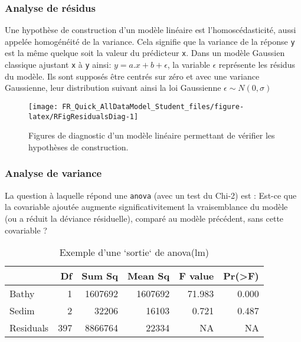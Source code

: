 \documentclass[french,a4paper]{article}
\begin{document}
\subsubsection{Analyse de résidus}\label{analyse-de-residus}

Une hypothèse de construction d'un modèle linéaire est
l'homoscédasticité, aussi appelée homogénéité de la variance. Cela
signifie que la variance de la réponse \texttt{y} est la même quelque
soit la valeur du prédicteur \texttt{x}. Dans un modèle Gaussien
classique ajustant \texttt{x} à \texttt{y} ainsi:
\(y = a.x + b + \epsilon\), la variable \(\epsilon\) représente les
résidus du modèle. Ils sont supposés être centrés sur zéro et avec une
variance Gaussienne, leur distribution suivant ainsi la loi Gaussienne
\(\epsilon \sim N(0, \sigma)\)




\begin{figure}[!h]

{\centering \texttt{[image: FR\_Quick\_AllDataModel\_Student\_files/figure-latex/RFigResidualsDiag-1]} 

}

\caption{Figures de diagnostic d'un modèle linéaire
permettant de vérifier les hypothèses de construction.}\label{fig:RFigResidualsDiag}
\end{figure}

\subsubsection{Analyse de variance}\label{analyse-de-variance}

La question à laquelle répond une \texttt{anova} (avec un test du Chi-2)
est : Est-ce que la covariable ajoutée augmente significativitement la
vraisemblance du modèle (ou a réduit la déviance résiduelle), comparé au
modèle précédent, sans cette covariable ?

\begin{table}

\caption{\label{tab:RTableAnova}Exemple d'une `sortie` de anova(lm)}
\centering
\begin{tabular}[t]{l|r|r|r|r|r}
\hline
  & Df & Sum Sq & Mean Sq & F value & Pr(>F)\\
\hline
Bathy & 1 & 1607692 & 1607692 & 71.983 & 0.000\\
\hline
Sedim & 2 & 32206 & 16103 & 0.721 & 0.487\\
\hline
Residuals & 397 & 8866764 & 22334 & NA & NA\\
\hline
\end{tabular}
\end{table}
\end{document}
